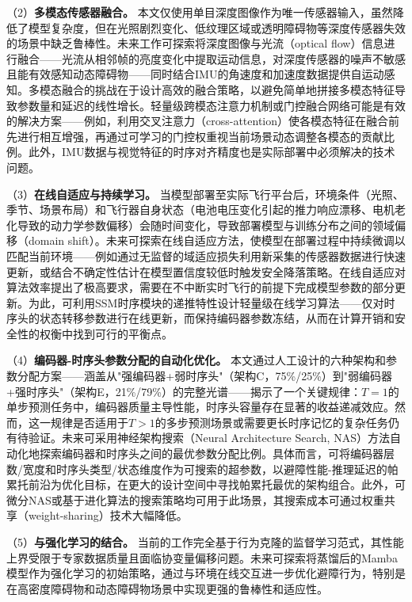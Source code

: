 \documentclass[12pt,a4paper]{article}
\numberwithin{equation}{section}
\numberwithin{figure}{section}
\numberwithin{table}{section}
\begin{document}
（2）\textbf{多模态传感器融合。} 本文仅使用单目深度图像作为唯一传感器输入，虽然降低了模型复杂度，但在光照剧烈变化、低纹理区域或透明障碍物等深度传感器失效的场景中缺乏鲁棒性。未来工作可探索将深度图像与光流（optical flow）信息进行融合——光流从相邻帧的亮度变化中提取运动信息，对深度传感器的噪声不敏感且能有效感知动态障碍物——同时结合IMU的角速度和加速度数据提供自运动感知。多模态融合的挑战在于设计高效的融合策略，以避免简单地拼接多模态特征导致参数量和延迟的线性增长。轻量级跨模态注意力机制或门控融合网络可能是有效的解决方案——例如，利用交叉注意力（cross-attention）使各模态特征在融合前先进行相互增强，再通过可学习的门控权重视当前场景动态调整各模态的贡献比例。此外，IMU数据与视觉特征的时序对齐精度也是实际部署中必须解决的技术问题。

（3）\textbf{在线自适应与持续学习。} 当模型部署至实际飞行平台后，环境条件（光照、季节、场景布局）和飞行器自身状态（电池电压变化引起的推力响应漂移、电机老化导致的动力学参数偏移）会随时间变化，导致部署模型与训练分布之间的领域偏移（domain shift）。未来可探索在线自适应方法，使模型在部署过程中持续微调以匹配当前环境——例如通过无监督的域适应损失利用新采集的传感器数据进行快速更新，或结合不确定性估计在模型置信度较低时触发安全降落策略。在线自适应对算法效率提出了极高要求，需要在不中断实时飞行的前提下完成模型参数的部分更新。为此，可利用SSM时序模块的递推特性设计轻量级在线学习算法——仅对时序头的状态转移参数进行在线更新，而保持编码器参数冻结，从而在计算开销和安全性的权衡中找到可行的平衡点。

（4）\textbf{编码器-时序头参数分配的自动化优化。} 本文通过人工设计的六种架构和参数分配方案——涵盖从"强编码器+弱时序头"（架构C，75\%/25\%）到"弱编码器+强时序头"（架构E，21\%/79\%）的完整光谱——揭示了一个关键规律：$T=1$的单步预测任务中，编码器质量主导性能，时序头容量存在显著的收益递减效应。然而，这一规律是否适用于$T>1$的多步预测场景或需要更长时序记忆的复杂任务仍有待验证。未来可采用神经架构搜索（Neural Architecture Search, NAS）方法自动化地探索编码器和时序头之间的最优参数分配比例。具体而言，可将编码器层数/宽度和时序头类型/状态维度作为可搜索的超参数，以避障性能-推理延迟的帕累托前沿为优化目标，在更大的设计空间中寻找帕累托最优的架构组合。此外，可微分NAS或基于进化算法的搜索策略均可用于此场景，其搜索成本可通过权重共享（weight-sharing）技术大幅降低。

（5）\textbf{与强化学习的结合。} 当前的工作完全基于行为克隆的监督学习范式，其性能上界受限于专家数据质量且面临协变量偏移问题。未来可探索将蒸馏后的Mamba模型作为强化学习的初始策略，通过与环境在线交互进一步优化避障行为，特别是在高密度障碍物和动态障碍物场景中实现更强的鲁棒性和适应性。
\end{document}
